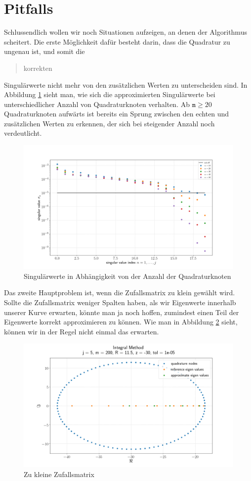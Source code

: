 \section{Pitfalls}

Schlussendlich wollen wir noch Situationen aufzeigen, an denen der Algorithmus scheitert.
Die erste Möglichkeit dafür besteht darin, dass die Quadratur zu ungenau ist, und somit die \blockquote{korrekten} Singulärwerte nicht mehr von den zusätzlichen Werten zu unterscheiden sind.
In Abbildung \ref{fig:plot4} sieht man, wie sich die approximierten Singulärwerte bei unterschiedlicher Anzahl von Quadraturknoten verhalten.
Ab $\texttt{m} \geq 20$ Quadraturknoten aufwärts ist bereits ein Sprung zwischen den echten und zusätzlichen Werten zu erkennen, der sich bei steigender Anzahl noch verdeutlicht.

\begin{figure}[H]
  \includegraphics[width = \linewidth]{Plots/singulaerwerte_quadraturknoten.png}
  \caption{Singulärwerte in Abhängigkeit von der Anzahl der Quadraturknoten}
  \label{fig:plot4}
\end{figure}

Das zweite Hauptproblem ist, wenn die Zufallsmatrix zu klein gewählt wird.
Sollte die Zufallsmatrix weniger Spalten haben, als wir Eigenwerte innerhalb unserer Kurve erwarten, könnte man ja noch hoffen, zumindest einen Teil der Eigenwerte korrekt approximieren zu können.
Wie man in Abbildung \ref{fig:plot5} sieht, können wir in der Regel nicht einmal das erwarten.

\begin{figure}[H]
  \includegraphics[width = \linewidth]{Plots/zufallsmatrix_zu_klein.png}
  \caption{Zu kleine Zufallsmatrix}
  \label{fig:plot5}
\end{figure}
